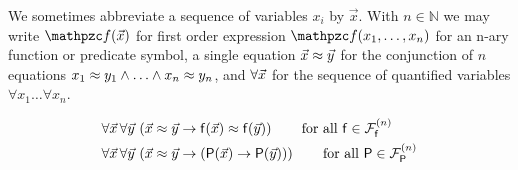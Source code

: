 \begin{definition}
	We sometimes abbreviate a sequence of variables $x_i$ by $\vec{x}$.
	With $n\in\mathbb{N}$ we may write $\mcf(\vecn{x})$ 
	for first order expression $\mcf(x_1,\ldots,x_n)$
	for an n-ary function or predicate symbol,
	a single equation $\vec{x}\approx\vec{y}$ for
	the conjunction of $n$ equations 
	$x_1\approx y_1\land\ldots\land x_n\approx y_n$,
	and $\forall\vec{x}$ for 
	the sequence of quantified variables $\forall x_1\ldots\forall x_n$.
\end{definition}

\begin{definition}
	\label{def:congruence:schemata}
	\begin{align*}
	\forall\vecn{x}\,\forall\vecn{y}\,
	&\left(\vecn{x}\mEQ\vecn{y} \limp \mf(\vecn{x}) \mEQ \mf(\vecn{y}) \right)
	\tag*{for all $\mf\in\mcFfn$}
	\\
	\forall\vecn{x}\,\forall\vecn{y}\, 
	&\left(\vecn{x}\mEQ\vecn{y} \limp (\mP(\vecn{x}) \limp \mP(\vecn{y}))\right)
	\tag*{for all $\mP\in\mcFPn$}
	\end{align*}
	
	
\end{definition}

